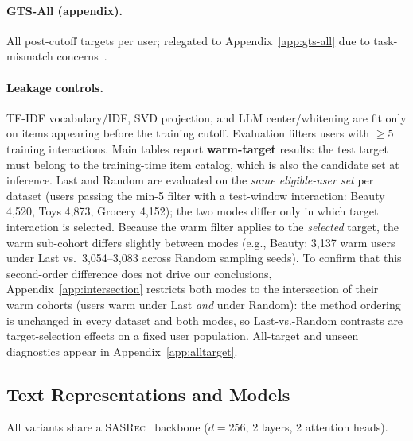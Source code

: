 \documentclass[sigconf,natbib=true,anonymous]{acmart}
\newcommand{\tfidf}{\textsc{TF-IDF}\xspace}
\newcommand{\base}{\textsc{SASRec}\xspace}
\begin{document}
\paragraph{GTS-All (appendix).}
All post-cutoff targets per user; relegated to Appendix~\ref{app:gts-all} due to task-mismatch concerns~\cite{gusak2025time}.

\paragraph{Leakage controls.}
\tfidf vocabulary/IDF, SVD projection, and LLM center/whitening are fit only on items appearing before the training cutoff.
Evaluation filters users with $\ge 5$ training interactions.
Main tables report \textbf{warm-target} results: the test target must belong to the training-time item catalog, which is also the candidate set at inference.
Last and Random are evaluated on the \emph{same eligible-user set} per dataset (users passing the min-5 filter with a test-window interaction: Beauty 4{,}520, Toys 4{,}873, Grocery 4{,}152); the two modes differ only in which target interaction is selected.
Because the warm filter applies to the \emph{selected} target, the warm sub-cohort differs slightly between modes (e.g., Beauty: 3{,}137 warm users under Last vs.\ 3{,}054--3{,}083 across Random sampling seeds).
To confirm that this second-order difference does not drive our conclusions, Appendix~\ref{app:intersection} restricts both modes to the intersection of their warm cohorts (users warm under Last \emph{and} under Random): the method ordering is unchanged in every dataset and both modes, so Last-vs.-Random contrasts are target-selection effects on a fixed user population.
All-target and unseen diagnostics appear in Appendix~\ref{app:alltarget}.

\subsection{Text Representations and Models}
\label{sec:models}

All variants share a \base~\cite{kang2018sasrec} backbone ($d{=}256$, 2 layers, 2 attention heads).
\end{document}
